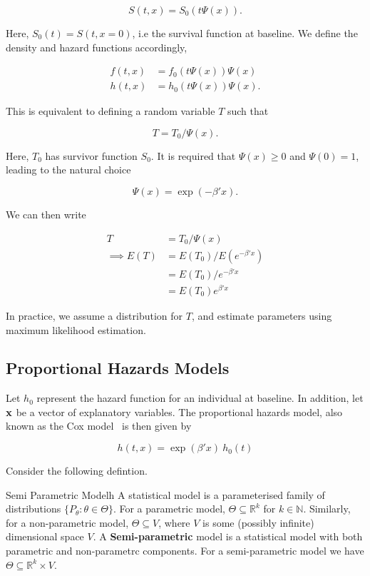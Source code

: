 \[
    S(t, x) = S_0(t\Psi(x)).
\]

Here, $S_0(t) = S(t, x = 0)$, i.e the survival function at baseline. We define the density and hazard functions accordingly,

\begin{align*}
    f(t, x) &= f_0(t\Psi(x))\Psi(x) \\
    h(t, x) &= h_0(t\Psi(x))\Psi(x).
\end{align*}

This is equivalent to defining a random variable $T$ such that

\[
    T = T_0/\Psi(x).  
\]

Here, $T_0$ has survivor function $S_0$. It is required that $\Psi(x) \geq 0$ and $\Psi(0) = 1$, leading to the natural choice 

\[
    \Psi(x) = \exp(-\beta'x).  
\]

We can then write 

\begin{align*}
    T &= T_0/\Psi(x) \\
    \implies E(T) &= E(T_0)/E(e^{-\beta'x}) \\
    &= E(T_0)/e^{-\beta'x} \\
    &= E(T_0)e^{\beta'x}
\end{align*}

In practice, we assume a distribution for $T$, and estimate parameters using maximum likelihood estimation. 

\subsection{Proportional Hazards Models}

Let $h_0$ represent the hazard function for an individual at baseline. In addition, let $\bf{x}$ be a vector of explanatory variables. The proportional hazards model, also known as the Cox model~\cite{cox1972} is then given by 

\begin{equation}
    h(t, x) = \exp(\beta'x) \ h_0(t)
    \label{coxmodel}
\end{equation}

Consider the following defintion.

\begin{definition}{Semi Parametric Model}{h}
    A statistical model is a parameterised family of distributions $\{P_{\theta} : \theta \in \Theta\}$. 
    For a parametric model, $\Theta \subseteq \mathbb{R}^k$ for $k \in \mathbb{N}$. Similarly, for a non-parametric model, $\Theta \subseteq V$, where $V$ is some (possibly infinite) dimensional space $V$. A \textbf{Semi-parametric} model is a statistical model with both parametric and non-parametrc components. For a semi-parametric model we have $\Theta \subseteq \mathbb{R}^k \times V$.
\end{definition}

